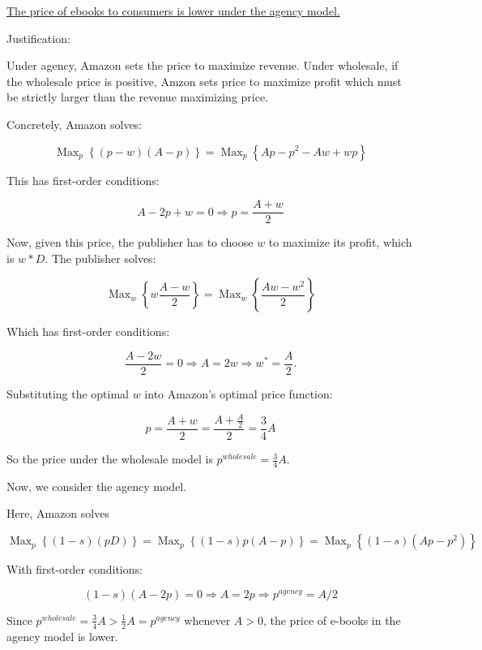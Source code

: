 \documentclass{article}
\DeclareMathOperator*{\Max}{Max}
\newenvironment{solution}{\color{red}}{\color{black}}
\begin{document}
\begin{solution}
\underline{The price of ebooks to consumers is lower under the agency model.}

Justification:

Under agency, Amazon sets the price to maximize revenue. Under wholesale, if the wholesale price is positive, Amzon sets price to maximize profit which must be strictly larger than the revenue maximizing price.

Concretely, Amazon solves:

\[ \Max_p \left\{ (p-w)(A-p) \right\} =\Max_p \left\{ Ap-p^2-Aw+wp \right\} \]

This has first-order conditions:

\[ A-2p+w=0 \Rightarrow p=\frac{A+w}{2} \]

Now, given this price, the publisher has to choose $w$ to maximize its profit, which is $w*D$. The publisher solves:

\[ \Max_w \left\{ w\frac{A-w}{2} \right\} =\Max_w \left\{ \frac{Aw-w^2}{2} \right\} \]

Which has first-order conditions:

\[ \frac{A-2w}{2}=0 \Rightarrow A=2w \Rightarrow w^{*}=\frac{A}{2}. \]

Substituting the optimal $w$ into Amazon's optimal price function:

\[ p=\frac{A+w}{2}=\frac{A+\frac{A}{2}}{2}=\frac34 A \]

So the price under the wholesale model is $p^{wholesale}=\frac34 A$.

Now, we consider the agency model.

Here, Amazon solves

\[ \Max_p \left\{ (1-s)(pD) \right\} = \Max_p \left\{ (1-s)p(A-p) \right\} = \Max_p \left\{(1-s)(Ap-p^2) \right\} \]

With first-order conditions:

\[ (1-s)(A-2p)=0 \Rightarrow A=2p \Rightarrow p^{agency}=A/2 \]


Since $p^{wholesale}=\frac34 A > \frac12 A=p^{agency}$ whenever $A>0$, the price of e-books in the agency model is lower.
\end{solution}
\end{document}
